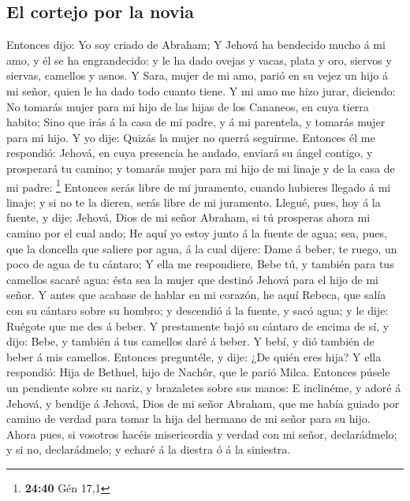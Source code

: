 \hypertarget{el-cortejo-por-la-novia}{%
\subsection{El cortejo por la novia}\label{el-cortejo-por-la-novia}}

 Entonces dijo: Yo soy criado de Abraham;  Y
Jehová ha bendecido mucho á mi amo, y él se ha engrandecido: y le ha
dado ovejas y vacas, plata y oro, siervos y siervas, camellos y asnos.
 Y Sara, mujer de mi amo, parió en su vejez un hijo á mi
señor, quien le ha dado todo cuanto tiene.  Y mi amo me
hizo jurar, diciendo: No tomarás mujer para mi hijo de las hijas de los
Cananeos, en cuya tierra habito;  Sino que irás á la casa
de mi padre, y á mi parentela, y tomarás mujer para mi hijo.
 Y yo dije: Quizás la mujer no querrá seguirme.
 Entonces él me respondió: Jehová, en cuya presencia he
andado, enviará su ángel contigo, y prosperará tu camino; y tomarás
mujer para mi hijo de mi linaje y de la casa de mi padre: \footnote{\textbf{24:40}
  Gén 17,1}  Entonces serás libre de mi juramento, cuando
hubieres llegado á mi linaje; y si no te la dieren, serás libre de mi
juramento.  Llegué, pues, hoy á la fuente, y dije: Jehová,
Dios de mi señor Abraham, si tú prosperas ahora mi camino por el cual
ando;  He aquí yo estoy junto á la fuente de agua; sea,
pues, que la doncella que saliere por agua, á la cual dijere: Dame á
beber, te ruego, un poco de agua de tu cántaro;  Y ella me
respondiere, Bebe tú, y también para tus camellos sacaré agua: ésta sea
la mujer que destinó Jehová para el hijo de mi señor.  Y
antes que acabase de hablar en mi corazón, he aquí Rebeca, que salía con
su cántaro sobre su hombro; y descendió á la fuente, y sacó agua; y le
dije: Ruégote que me des á beber.  Y prestamente bajó su
cántaro de encima de sí, y dijo: Bebe, y también á tus camellos daré á
beber. Y bebí, y dió también de beber á mis camellos. 
Entonces preguntéle, y dije: ¿De quién eres hija? Y ella respondió: Hija
de Bethuel, hijo de Nachôr, que le parió Milca. Entonces púsele un
pendiente sobre su nariz, y brazaletes sobre sus manos:  E
inclinéme, y adoré á Jehová, y bendije á Jehová, Dios de mi señor
Abraham, que me había guiado por camino de verdad para tomar la hija del
hermano de mi señor para su hijo.  Ahora pues, si vosotros
hacéis misericordia y verdad con mi señor, declarádmelo; y si no,
declarádmelo; y echaré á la diestra ó á la siniestra.

